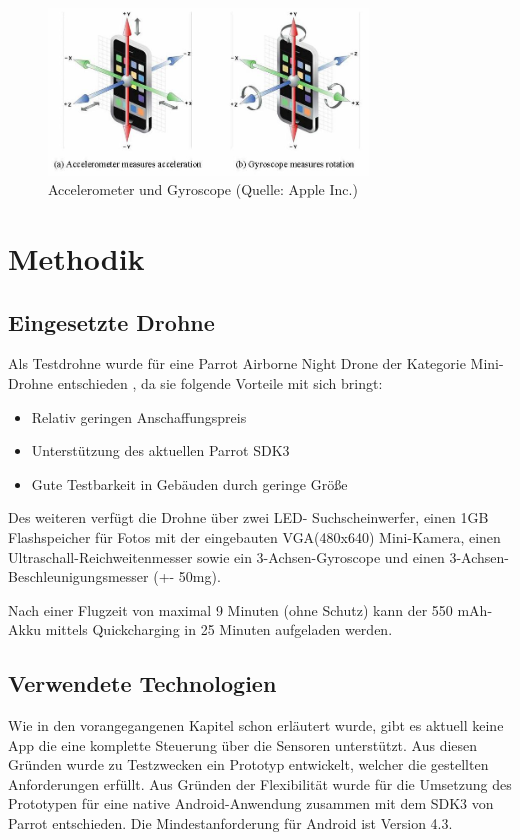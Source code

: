 \documentclass{article}
\begin{document}
\begin{figure}
\begin{minipage}[b]{1.0\linewidth}
  \centering
\centerline{\includegraphics[width= 85mm]{gyro.jpg}}
\end{minipage}
\caption{Accelerometer und Gyroscope (Quelle: Apple Inc.)}
\label{fig:gyro}
\end{figure}

\section{Methodik}

\subsection{Eingesetzte Drohne}
Als Testdrohne wurde für eine Parrot Airborne Night Drone der Kategorie Mini-Drohne entschieden \cite{minidrone}, da sie folgende Vorteile mit sich bringt: 
\begin{itemize}
	\item Relativ geringen Anschaffungspreis
	\item Unterstützung des aktuellen Parrot SDK3
	\item Gute Testbarkeit in Gebäuden durch geringe Größe 
\end{itemize}

Des weiteren verfügt die Drohne über zwei LED- Suchscheinwerfer, einen 1GB Flashspeicher für Fotos mit der eingebauten VGA(480x640) Mini-Kamera, einen Ultraschall-Reichweitenmesser sowie ein 3-Achsen-Gyroscope und einen 3-Achsen- Beschleunigungsmesser (+\/- 50mg).

Nach einer Flugzeit von maximal 9 Minuten (ohne Schutz) kann der 550 mAh-Akku mittels Quickcharging in 25 Minuten aufgeladen werden.

\subsection{Verwendete Technologien}
Wie in den vorangegangenen Kapitel schon erläutert wurde, gibt es aktuell keine App die eine komplette Steuerung über die Sensoren unterstützt. Aus diesen Gründen wurde zu Testzwecken ein Prototyp entwickelt, welcher die gestellten Anforderungen erfüllt. Aus Gründen der Flexibilität wurde für die Umsetzung des Prototypen für eine native Android-Anwendung zusammen mit dem SDK3 von Parrot entschieden. Die Mindestanforderung für Android ist Version 4.3.\\ 
\end{document}
